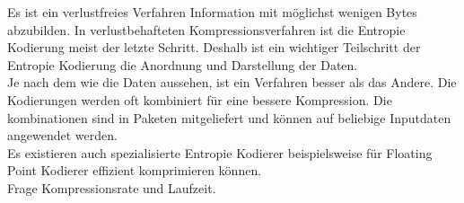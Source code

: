  Es ist ein verlustfreies Verfahren Information mit möglichst wenigen Bytes abzubilden. In verlustbehafteten Kompressionsverfahren ist die Entropie Kodierung meist der letzte Schritt. Deshalb ist ein wichtiger Teilschritt der Entropie Kodierung die Anordnung und Darstellung der Daten.\\
Je nach dem wie die Daten aussehen, ist ein Verfahren besser als das Andere.  Die Kodierungen werden oft kombiniert für eine bessere Kompression. Die kombinationen sind in Paketen mitgeliefert und können auf beliebige Inputdaten angewendet werden.\\

Es existieren auch spezialisierte Entropie Kodierer beispielsweise für Floating Point Kodierer \cite{ratanaworabhan2006fast} effizient komprimieren können.\\
Frage Kompressionsrate und Laufzeit.
